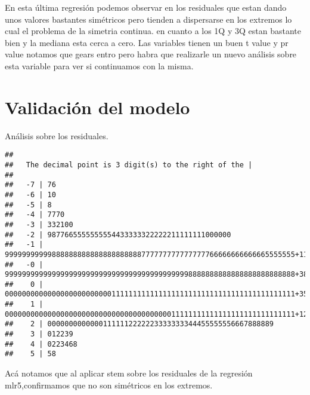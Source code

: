 \documentclass[
]{article}
\newenvironment{Shaded}{\begin{snugshade}}{\end{snugshade}}
\newcommand{\DataTypeTok}[1]{\textcolor[rgb]{0.13,0.29,0.53}{#1}}
\newcommand{\DecValTok}[1]{\textcolor[rgb]{0.00,0.00,0.81}{#1}}
\newcommand{\KeywordTok}[1]{\textcolor[rgb]{0.13,0.29,0.53}{\textbf{#1}}}
\newcommand{\NormalTok}[1]{#1}
\newcommand{\OperatorTok}[1]{\textcolor[rgb]{0.81,0.36,0.00}{\textbf{#1}}}
\newcommand{\StringTok}[1]{\textcolor[rgb]{0.31,0.60,0.02}{#1}}
\begin{document}
En esta última regresión podemos observar en los residuales que estan
dando unos valores bastantes simétricos pero tienden a dispersarse en
los extremos lo cual el problema de la simetria continua. en cuanto a
los 1Q y 3Q estan bastante bien y la mediana esta cerca a cero. Las
variables tienen un buen t value y pr value notamos que gears entro pero
habra que realizarle un nuevo análisis sobre esta variable para ver si
continuamos con la misma.

\hypertarget{validaciuxf3n-del-modelo}{%
\section{Validación del modelo}\label{validaciuxf3n-del-modelo}}

Análisis sobre los residuales.

\begin{Shaded}
\end{Shaded}

\begin{verbatim}
## 
##   The decimal point is 3 digit(s) to the right of the |
## 
##   -7 | 76
##   -6 | 10
##   -5 | 8
##   -4 | 7770
##   -3 | 332100
##   -2 | 9877665555555554433333322222211111111000000
##   -1 | 99999999999888888888888888888888777777777777777766666666666665555555+119
##   -0 | 99999999999999999999999999999999999999999998888888888888888888888888+388
##    0 | 00000000000000000000000001111111111111111111111111111111111111111111+355
##    1 | 00000000000000000000000000000000000000011111111111111111111111111111+128
##    2 | 00000000000001111112222223333333344455555556667888889
##    3 | 012239
##    4 | 0223468
##    5 | 58
\end{verbatim}

Acá notamos que al aplicar stem sobre los residuales de la regresión
mlr5,confirmamos que no son simétricos en los extremos.

\begin{Shaded}
\end{Shaded}
\end{document}
